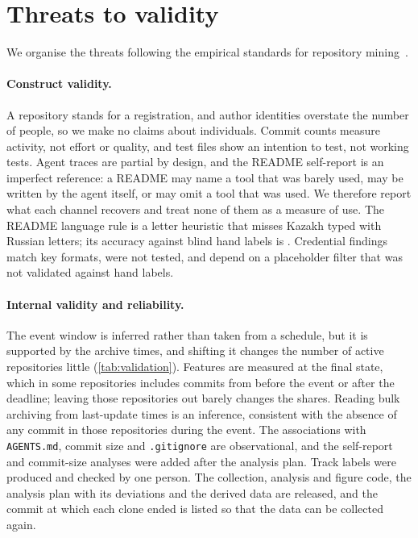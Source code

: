 \documentclass{article}
\begin{document}
\section{Threats to validity}\label{sec:threats}

We organise the threats following the empirical standards for repository mining~\cite{ralph2020standards}.

\paragraph{Construct validity.} A repository stands for a registration, and author identities overstate the number of people, so we make no claims about individuals. Commit counts measure activity, not effort or quality, and test files show an intention to test, not working tests. Agent traces are partial by design, and the README self-report is an imperfect reference: a README may name a tool that was barely used, may be written by the agent itself, or may omit a tool that was used. We therefore report what each channel recovers and treat none of them as a measure of use. The README language rule is a letter heuristic that misses Kazakh typed with Russian letters; its accuracy against blind hand labels is . Credential findings match key formats, were not tested, and depend on a placeholder filter that was not validated against hand labels.

\paragraph{Internal validity and reliability.} The event window is inferred rather than taken from a schedule, but it is supported by the archive times, and shifting it changes the number of active repositories little (\cref{tab:validation}). Features are measured at the final state, which in some repositories includes commits from before the event or after the deadline; leaving those repositories out barely changes the shares. Reading bulk archiving from last-update times is an inference, consistent with the absence of any commit in those repositories during the event. The associations with \texttt{AGENTS.md}, commit size and \texttt{.gitignore} are observational, and the self-report and commit-size analyses were added after the analysis plan. Track labels were produced and checked by one person. The collection, analysis and figure code, the analysis plan with its deviations and the derived data are released, and the commit at which each clone ended is listed so that the data can be collected again.
\end{document}
